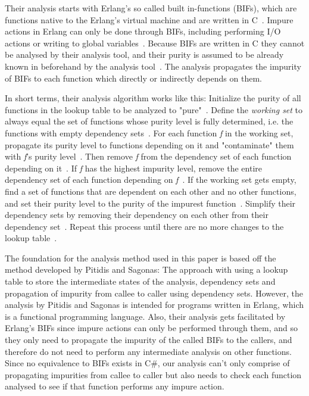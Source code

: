 \documentclass[a4paper,12pt]{article}
\begin{document}
Their analysis starts with Erlang's so called built in-functions (BIFs), which are functions native to the Erlang's virtual machine and are written in C~\cite{pitidis2010purity}. Impure actions in Erlang can only be done through BIFs, including performing I/O actions or writing to global variables~\cite{kostis-email}. Because BIFs are written in C they cannot be analysed by their analysis tool, and their purity is assumed to be already known in beforehand by the analysis tool~\cite{pitidis2010purity}. The analysis propagates the impurity of BIFs to each function which directly or indirectly depends on them.

In short terms, their analysis algorithm works like this: Initialize the purity of all functions in the lookup table to be analyzed to "pure"~\cite{pitidis2010purity}. Define the \textit{working set} to always equal the set of functions whose purity level is fully determined, i.e. the functions with empty dependency sets~\cite{pitidis2010purity}. For each function \textit{f} in the working set, propagate its purity level to functions depending on it and "contaminate" them with \textit{f}'s purity level~\cite{pitidis2010purity}. Then remove \textit{f} from the  dependency set of each function depending on it~\cite{pitidis2010purity}. If \textit{f} has the highest impurity level, remove the entire dependency set of each function depending on \textit{f}~\cite{pitidis2010purity}. If the working set gets empty, find a set of functions that are dependent on each other and no other functions, and set their purity level to the purity of the impurest function~\cite{pitidis2010purity}. Simplify their dependency sets by removing their dependency on each other from their dependency set~\cite{pitidis2010purity}. Repeat this process until there are no more changes to the lookup table~\cite{pitidis2010purity}.

The foundation for the analysis method used in this paper is based off the method developed by Pitidis and Sagonas: The approach with using a lookup table to store the intermediate states of the analysis, dependency sets and propagation of impurity from callee to caller using dependency sets. However, the analysis by Pitidis and Sagonas is intended for programs written in Erlang, which is a functional programming language. Also, their analysis gets facilitated by Erlang's BIFs since impure actions can only be performed through them, and so they only need to propagate the impurity of the called BIFs to the callers, and therefore do not need to perform any intermediate analysis on other functions. Since no equivalence to BIFs exists in C\#, our analysis can't only comprise of propagating impurities from callee to caller but also needs to check each function analysed to see if that function performs any impure action.
\end{document}

